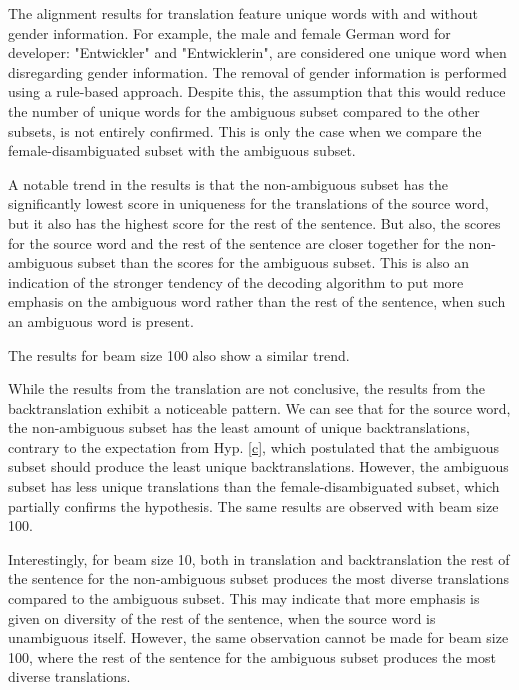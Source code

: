 
The alignment results for translation feature unique words with and without gender information. For example, the male and female German word for developer: "Entwickler" and "Entwicklerin", are considered one unique word when disregarding gender information. The removal of gender information is performed using a rule-based approach. Despite this, the assumption that this would reduce the number of unique words for the ambiguous subset compared to the other subsets, is not entirely confirmed. This is only the case when we compare the female-disambiguated subset with the ambiguous subset.


A notable trend in the results is that the non-ambiguous subset has the significantly lowest score in uniqueness for the translations of the source word, but it also has the highest score for the rest of the sentence. But also, the scores for the source word and the rest of the sentence are closer together for the non-ambiguous subset than the scores for the ambiguous subset. This is also an indication of the stronger tendency of the decoding algorithm to put more emphasis on the ambiguous word rather than the rest of the sentence, when such an ambiguous word is present.

The results for beam size 100 also show a similar trend.

While the results from the translation are not conclusive, the results from the backtranslation exhibit a noticeable pattern. We can see that for the source word, the non-ambiguous subset has the least amount of unique backtranslations, contrary to the expectation from Hyp. \ref{c}, which postulated that the ambiguous subset should produce the least unique backtranslations. However, the ambiguous subset has less unique translations than the female-disambiguated subset, which partially confirms the hypothesis. The same results are observed with beam size 100.

Interestingly, for beam size 10, both in translation and backtranslation the rest of the sentence for the non-ambiguous subset produces the most diverse translations compared to the ambiguous subset. This may indicate that more emphasis is given on diversity of the rest of the sentence, when the source word is unambiguous itself. However, the same observation cannot be made for beam size 100, where the rest of the sentence for the ambiguous subset produces the most diverse translations.

